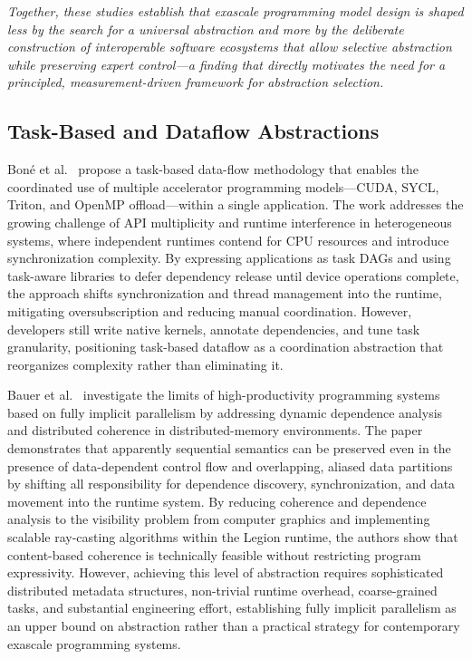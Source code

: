 \textit{Together, these studies establish that exascale programming model design
is shaped less by the search for a universal abstraction and more by the
deliberate construction of interoperable software ecosystems that allow selective
abstraction while preserving expert control---a finding that directly motivates
the need for a principled, measurement-driven framework for abstraction
selection.}

\subsection{Task-Based and Dataflow Abstractions}

Bon\'e et al.~\cite{bone2024taskbased} propose a task-based data-flow
methodology that enables the coordinated use of multiple accelerator programming
models---CUDA, SYCL, Triton, and OpenMP offload---within a single application.
The work addresses the growing challenge of API multiplicity and runtime
interference in heterogeneous systems, where independent runtimes contend for
CPU resources and introduce synchronization complexity. By expressing
applications as task DAGs and using task-aware libraries to defer dependency
release until device operations complete, the approach shifts synchronization
and thread management into the runtime, mitigating oversubscription and reducing
manual coordination. However, developers still write native kernels, annotate
dependencies, and tune task granularity, positioning task-based dataflow as a
coordination abstraction that reorganizes complexity rather than eliminating it.

Bauer et al.~\cite{bauer2012legion} investigate the limits of high-productivity
programming systems based on fully implicit parallelism by addressing dynamic
dependence analysis and distributed coherence in distributed-memory
environments. The paper demonstrates that apparently sequential semantics can be
preserved even in the presence of data-dependent control flow and overlapping,
aliased data partitions by shifting all responsibility for dependence discovery,
synchronization, and data movement into the runtime system. By reducing
coherence and dependence analysis to the visibility problem from computer
graphics and implementing scalable ray-casting algorithms within the Legion
runtime, the authors show that content-based coherence is technically feasible
without restricting program expressivity. However, achieving this level of
abstraction requires sophisticated distributed metadata structures, non-trivial
runtime overhead, coarse-grained tasks, and substantial engineering effort,
establishing fully implicit parallelism as an upper bound on abstraction rather
than a practical strategy for contemporary exascale programming systems.

